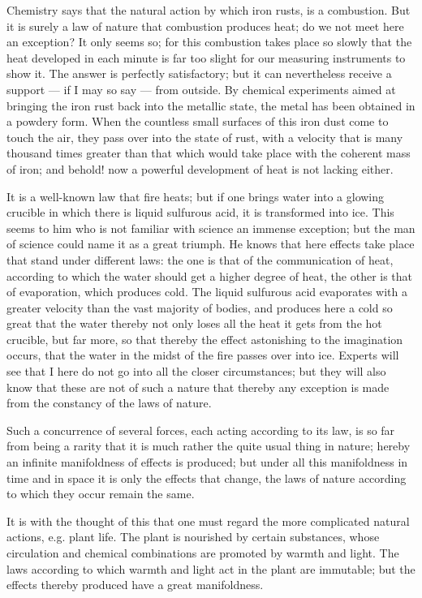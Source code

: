 \documentclass[12pt,a4paper,openany]{book}
\newcommand{\opage}[1]{\marginnote{\footnotesize\textit{[#1]}}}
\begin{document}
Chemistry says that the natural action by which iron
\setcounter{footnote}{0}%
\opage{72}rusts, is a combustion. But it is surely a law of nature that combustion
produces heat; do we not meet here an exception? It only seems so; for this
combustion takes place so slowly that the heat developed in each minute is far too
slight for our measuring instruments to show it. The answer is perfectly
satisfactory; but it can nevertheless receive a support --- if I may so
say --- from outside. By chemical experiments aimed at bringing the iron rust back
into the metallic state, the metal has been obtained in a powdery form. When the
countless small surfaces of this iron dust come to touch the air, they pass over
into the state of rust, with a velocity that is many thousand times greater than
that which would take place with the coherent mass of iron; and behold! now a
powerful development of heat is not lacking either.

It is a well-known law that fire heats; but if one brings water into a glowing
crucible in which there is liquid sulfurous acid, it is transformed into ice. This
seems to him who is not familiar with science an immense exception; but the man of
science could name it as a great triumph. He knows that here effects take place that
stand under different laws: the one is that of the communication of heat, according
to which the water should get a higher degree of heat, the other is that of
evaporation, which produces cold. The liquid sulfurous acid evaporates with a
greater velocity than the vast majority of bodies, and produces here a cold so great
that the water thereby not only loses all the heat it gets from the hot crucible,
but far more, so that thereby the effect astonishing to the imagination occurs, that
the water in the midst of the fire passes over into ice. Experts will see that I
here do not go into all the closer circumstances; but they will also know that these
are not of such a nature that thereby any exception is made from the constancy of
the laws of nature.

Such a concurrence of several forces, each acting according to its law, is so far
from being a rarity that it is much rather the quite usual thing in nature;
\setcounter{footnote}{0}%
\opage{73}hereby an infinite manifoldness of effects is produced; but under all this
manifoldness in time and in space it is only the effects that change, the laws of
nature according to which they occur remain the same.

It is with the thought of this that one must regard the more complicated natural
actions, e.g. plant life. The plant is nourished by certain substances, whose
circulation and chemical combinations are promoted by warmth and light. The laws
according to which warmth and light act in the plant are immutable; but the effects
thereby produced have a great manifoldness.
\end{document}
